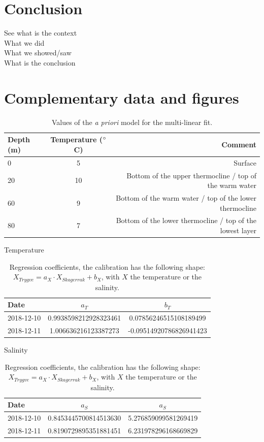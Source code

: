 \documentclass[12pt,a4paper]{article}
\begin{document}
\section{Conclusion}

See what is the context\\
What we did\\
What we showed/saw\\
What is the conclusion





\newpage

\appendix
\setcounter{figure}{0}

\section{Complementary data and figures}

\begin{table}[h]
  \centering
  \begin{tabular}{|l|c|r|}
    \hline
    Depth (m) & Temperature ($^{\circ}$C) & Comment \\
    \hline
    0 & 5 & Surface\\
    20 & 10 & Bottom of the upper thermocline / top of the warm water\\
    60 & 9 & Bottom of the warm water / top of the lower thermocline\\
    80 & 7 & Bottom of the lower thermocline / top of the lowest layer\\
    \hline
  \end{tabular}
  \caption{\label{tab:apriori}Values of the {\it a priori} model for the multi-linear fit.}
\end{table}

\begin{table}[h]
  \centering
  Temperature\\
  \begin{tabular}{|l|c|c|}
    \hline
    Date & $a_T$ & $b_T$ \\
    \hline
    2018-12-10 & 0.9938598212928323461 & 0.07856246515108189499\\
    2018-12-11 & 1.006636216123387273  & -0.09514920786826941423\\
    \hline
  \end{tabular}
  
  \vspace{.5cm}
  Salinity\\
  \begin{tabular}{|l|c|c|}
    \hline
    Date & $a_S$ & $a_S$ \\
    \hline
    2018-12-10 & 0.8453445700814513630 & 5.276859099581269419\\
    2018-12-11 & 0.8190729895351881451 & 6.231978296168669829\\
    \hline
  \end{tabular}
  \caption{\label{tab:calib}Regression coefficients, the calibration has the following
    shape:
    ${X_{Trygve} = a_X \cdot X_{Skagerrak} + b_X}$, with $X$
    the temperature or the salinity.}
\end{table}
\end{document}
